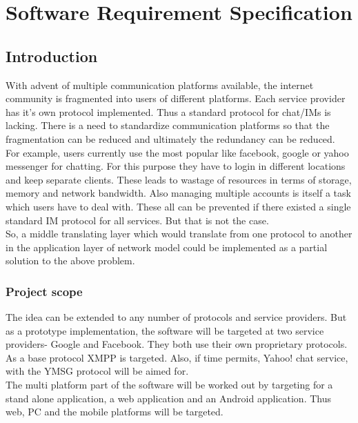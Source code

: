 \documentclass{SureshLimkar}
\begin{document}
\chapter{Software Requirement Specification}

\section{Introduction}
\hspace{0.5 in}With advent of multiple communication platforms available, the internet community is fragmented into users of different platforms. Each service provider has it's own protocol implemented. Thus a standard protocol for chat/IMs is lacking.  There is a need to standardize communication platforms so that the fragmentation can be reduced and ultimately the  redundancy can be reduced.
\\
\hspace{0.5 in}For example, users currently use the most popular like facebook, google or yahoo messenger for chatting. For this purpose they have to login in different locations and keep separate clients. These leads to wastage of resources in terms of storage, memory and network bandwidth. Also managing multiple accounts is itself a task which users have to deal with. These all can be prevented if there existed a single standard IM protocol for all services. But that is not the case.
\\
\hspace{0.5 in}So, a middle translating layer which would translate from one protocol to another in the application layer of network model could be implemented as a partial solution to the above problem. 
\\

\subsection{Project scope}
\hspace{0.5 in} The idea can be extended to any number of protocols and service providers. But as a prototype implementation, the software will be targeted at two service providers- Google and Facebook. They both use their own proprietary protocols. As a base protocol XMPP is targeted. Also, if time permits, Yahoo! chat service, with the YMSG protocol will be aimed for.
\\
\hspace{0.5 in}The multi platform part of the software will be worked out by targeting for a stand alone application, a web application and an Android application. Thus web, PC and the mobile platforms will be targeted.
\\
\end{document}
